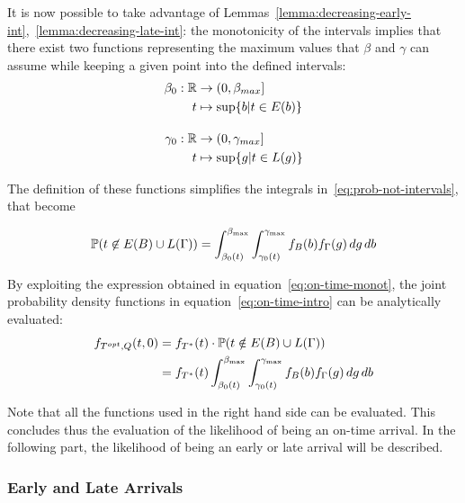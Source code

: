 It is now possible to take advantage of Lemmas~\ref{lemma:decreasing-early-int},~\ref{lemma:decreasing-late-int}:
the monotonicity of the intervals implies that there exist two functions representing the maximum values that \(\beta\) and \(\gamma\) can assume while keeping a given point into the defined intervals:
\begin{equation}
  \label{eq:def_b_0_g_0}
  \begin{split}
    \beta_0:\mathbb{R}&\rightarrow(0, \beta_{max}] \\
    t&\mapsto \sup\{b | t \in E(b)\} \\[1em]
    \gamma_0:\mathbb{R}&\rightarrow(0, \gamma_{max}] \\
    t&\mapsto \sup\{g | t \in L(g)\}
  \end{split}
\end{equation}

The definition of these functions simplifies the integrals in~\eqref{eq:prob-not-intervals}, that become

\begin{equation}
  \label{eq:on-time-monot}
  \mathbb{P}( t \not\in E(B) \cup L(\Gamma)) = \int_{\beta_0(t)}^{\beta_{\text{max}}}\int_{\gamma_0(t)}^{\gamma_{\text{max}}}f_B(b)f_\Gamma(g)\, dg\, db
\end{equation}

By exploiting the expression obtained in equation~\eqref{eq:on-time-monot},
the joint probability density functions in equation~\eqref{eq:on-time-intro} can be analytically evaluated:
\begin{equation}
  \label{eq:on-time-final}
  \begin{split}
    f_{T^{opt}, Q}(t, 0) & = f_{T^*}(t) \cdot \mathbb{P}(t \notin E(B) \cup L(\Gamma)) \\
    & = f_{T^*}(t)\int_{\beta_0(t)}^{\beta_{\text{max}}}\int_{\gamma_0(t)}^{\gamma_{\text{max}}}f_B(b)f_\Gamma(g)\, dg\, db
  \end{split}
\end{equation}

Note that all the functions used in the right hand side can be evaluated.
This concludes thus the evaluation of the likelihood of being an on-time arrival.
In the following part, the likelihood of being an early or late arrival will be described.

\subsubsection{Early and Late Arrivals}

